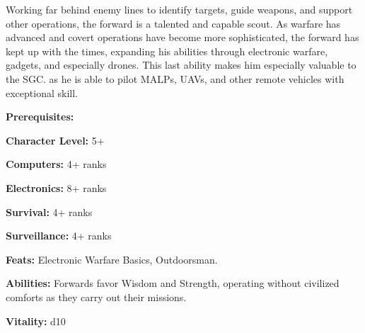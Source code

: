 \begin{multicols}{2}

Working far behind enemy lines to identify targets, guide weapons, and support other operations, the forward is a talented and capable scout. As warfare has advanced and covert operations have become more sophisticated, the forward has kept up with the times, expanding his abilities through electronic warfare, gadgets, and especially drones. This last ability makes him especially valuable to the SGC. as he is able to pilot MALPs, UAVs, and other remote vehicles with exceptional skill.

\columnbreak

\textbf{Prerequisites:} 
\begin{description*}
\item[\hspace{1.5cm}\textbf{Character Level:}] 5+
\item[\hspace{1.5cm}\textbf{Computers:}] 4+ ranks
\item[\hspace{1.5cm}\textbf{Electronics:}] 8+ ranks
\item[\hspace{1.5cm}\textbf{Survival:}] 4+ ranks
\item[\hspace{1.5cm}\textbf{Surveillance:}] 4+ ranks
\item[\hspace{1.5cm}\textbf{Feats:}] Electronic Warfare Basics, Outdoorsman.
\end{description*}

\textbf{Abilities:} Forwards favor Wisdom and Strength, operating without civilized comforts as they carry out their missions.

\textbf{Vitality:} d10

\end{multicols}

\setlength{\intextsep}{-1cm}

